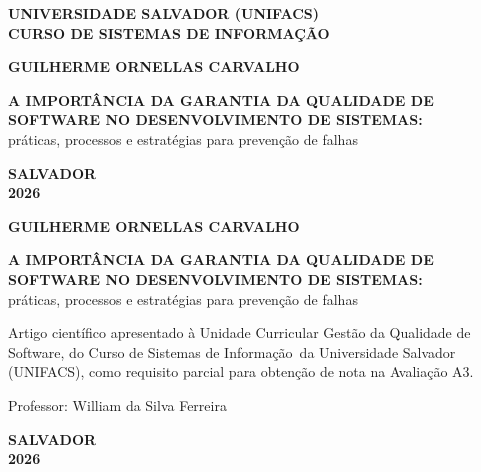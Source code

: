 \documentclass[12pt,a4paper]{article}
\newcommand{\autor}{Guilherme Ornellas Carvalho}
\newcommand{\cursonome}{Curso de Sistemas de Informação}
\newcommand{\professor}{William da Silva Ferreira}
\newcommand{\cidade}{Salvador}
\newcommand{\ano}{2026}
\begin{document}
\thispagestyle{empty}
\begin{center}
\textbf{UNIVERSIDADE SALVADOR (UNIFACS)}\\
\textbf{\MakeUppercase{\cursonome}}

\vspace{3.5cm}
\textbf{\MakeUppercase{\autor}}

\vfill
\textbf{A IMPORTÂNCIA DA GARANTIA DA QUALIDADE DE SOFTWARE NO DESENVOLVIMENTO DE SISTEMAS:}\\
práticas, processos e estratégias para prevenção de falhas

\vfill
\textbf{\MakeUppercase{\cidade}}\\
\textbf{\ano}
\end{center}
\newpage

\setcounter{page}{1}
\thispagestyle{empty}
\begin{center}
\textbf{\MakeUppercase{\autor}}

\vfill
\textbf{A IMPORTÂNCIA DA GARANTIA DA QUALIDADE DE SOFTWARE NO DESENVOLVIMENTO DE SISTEMAS:}\\
práticas, processos e estratégias para prevenção de falhas
\end{center}

\vspace{2cm}
\noindent\hspace*{8cm}%
\begin{minipage}{\dimexpr\textwidth-8cm\relax}
\begin{singlespace}
\small
Artigo científico apresentado à Unidade Curricular Gestão da Qualidade de Software, do \cursonome\ da Universidade Salvador (UNIFACS), como requisito parcial para obtenção de nota na Avaliação A3.

\vspace{0.5cm}
Professor: \professor
\end{singlespace}
\end{minipage}

\vfill
\begin{center}
\textbf{\MakeUppercase{\cidade}}\\
\textbf{\ano}
\end{center}
\newpage
\end{document}
